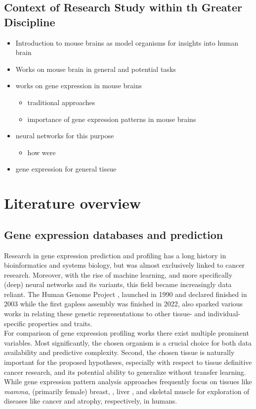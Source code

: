 \documentclass[]{article}
\renewcommand{\cite}{\citep}
\begin{document}
\subsection*{Context of Research Study within th Greater Discipline}

\begin{itemize}
	\item Introduction to mouse brains as model organisms for insights into human brain
	\item Works on mouse brain in general and potential tasks
	\item works on gene expression in mouse brains
	\begin{itemize}
		\item traditional approaches
		\item importance of gene expression patterns in mouse brains
	\end{itemize}
	\item neural networks for this purpose
	\begin{itemize}
		\item how were 
	\end{itemize}
	\item gene expression for general tissue
	
\end{itemize}

\newpage
\section{Literature overview}
\label{sec:relatedwork}
\subsection{Gene expression databases and prediction}
\label{sec:relatedwork_geneexp}
Research in gene expression prediction and profiling has a long history in bioinformatics and systems biology, but was almost exclusively linked to cancer research. Moreover, with the rise of machine learning, and more specifically (deep) neural networks and its variants, this field became increasingly data reliant. The Human Genome Project \cite{watson1990human}, launched in 1990 and declared finished in 2003 while the first gapless assembly was finished in 2022, also sparked various works in relating these genetic representations to other tissue- and individual-specific properties and traits.\\ 

For comparison of gene expression profiling works there exist multiple prominent variables. Most significantly, the chosen organism is a crucial choice for both data availability and predictive complexity. Second, the chosen tissue is naturally important for the proposed hypotheses, especially with respect to tissue definitive cancer research, and its potential ability to generalize without transfer learning. While gene expression pattern analysis approaches frequently focus on tissues like \textit{mamma}, (primarily female) breast, \cite{herschkowitz2007identification}, liver \cite{flores2002patterns}, and skeletal muscle \cite{lecker2004multiple} for exploration of diseases like cancer and atrophy, respectively, in humans. 
\end{document}
